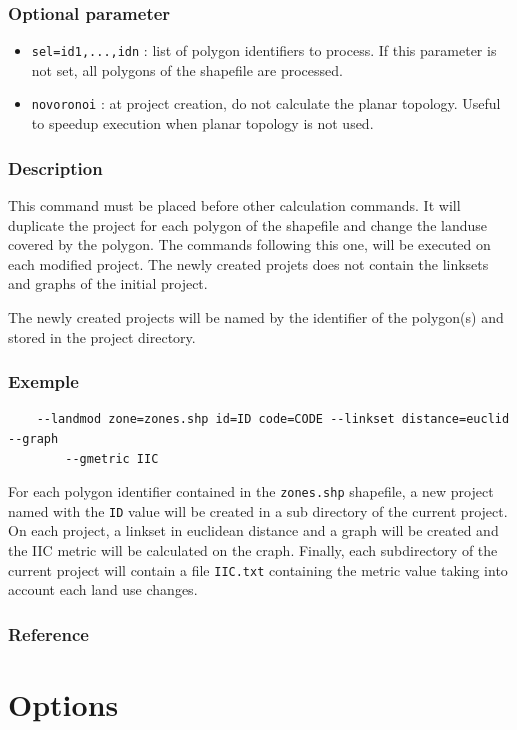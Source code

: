 \documentclass[a4paper,10pt]{report}
\begin{document}
\subsubsection{Optional parameter}
\begin{itemize}
	\item \verb|sel=id1,...,idn| : list of polygon identifiers to process. If this parameter is not set, all polygons of the shapefile are processed.
	\item \verb|novoronoi| : at project creation, do not calculate the planar topology. Useful to speedup execution when planar topology is not used.
\end{itemize}

\subsubsection{Description}
This command must be placed before other calculation commands. It will duplicate the project for each polygon of the shapefile and change the landuse covered by the polygon. The commands following this one, will be executed on each modified project. The newly created projets does not contain the linksets and graphs of the initial project.

The newly created projects will be named by the identifier of the polygon(s) and stored in the project directory.

\subsubsection{Exemple}
\begin{Verbatim}
	--landmod zone=zones.shp id=ID code=CODE --linkset distance=euclid --graph 
		--gmetric IIC
\end{Verbatim}
For each polygon identifier contained in the \verb|zones.shp| shapefile, a new project named with the \verb|ID| value will be created in a sub directory of the current project.
On each project, a linkset in euclidean distance and a graph will be created and the IIC metric will be calculated on the craph.
Finally, each subdirectory of the current project will contain a file \verb|IIC.txt| containing the metric value taking into account each land use changes.

\subsubsection{Reference}
\cite{2017_landmod}


\section{Options}
\end{document}
